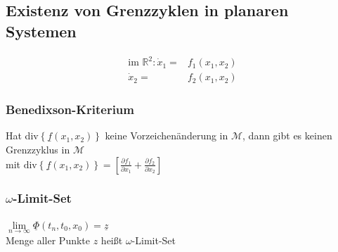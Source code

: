\documentclass[german]{latex4ei/latex4ei_sheet}
\begin{document}
\begin{sectionbox}
\subsection{Existenz von Grenzzyklen in planaren Systemen}

\begin{align*}
  \text{im $\mathbb{R}^2$:} \,
  \dot{x}_1 =&  f_1(x_1, x_2) \\
  \dot{x}_2 =&  f_2(x_1, x_2)
\end{align*}

\subsubsection{Benedixson-Kriterium}
Hat div$\left\{ \underline{f}(x_1, x_2) \right\}$ keine Vorzeichenänderung in $\mathcal{M}$, dann gibt es keinen Grenzzyklus in $\mathcal{M}$ \\
mit $\text{div}\left\{ \underline{f}(x_1, x_2) \right\} = \left[ \frac{\partial f_1}{\partial x_1} + \frac{\partial f_2}{ \partial x_2} \right]$

\subsubsection{$\omega$-Limit-Set}

$\lim\limits_{n \rightarrow \infty} \underline{\Phi} (t_n, t_0, x_0) = \underline{z}$ \\
Menge aller Punkte $z$ heißt $\omega$-Limit-Set
\end{sectionbox}
\end{document}
